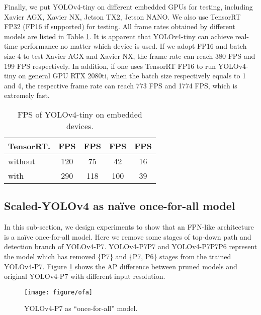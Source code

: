 \documentclass[10pt,twocolumn,letterpaper]{article}
\begin{document}
Finally, we put YOLOv4-tiny on different embedded GPUs for testing, including Xavier AGX, Xavier NX, Jetson TX2, Jetson NANO.  We also use TensorRT FP32 (FP16 if supported) for testing. All frame rates obtained by different models are listed in Table \ref{table:t15}.  It is apparent that YOLOv4-tiny can achieve real-time performance no matter which device is used.  If we adopt FP16 and batch size 4 to test Xavier AGX and Xavier NX, the frame rate can reach 380 FPS and 199 FPS respectively.  In addition, if one uses TensorRT FP16 to run YOLOv4-tiny on general GPU RTX 2080ti, when the batch size respectively equals to 1 and 4, the respective frame rate can reach 773 FPS and 1774 FPS, which is extremely fast.

\begin{table}[h]
	\centering
	\begin{threeparttable}[h]
		\footnotesize
		\caption{FPS of YOLOv4-tiny on embedded devices.}
		\label{table:t15}
		\setlength\tabcolsep{3.5pt}
		\begin{tabular}{lcccc}
			\toprule
			\textbf{TensorRT.} & \textbf{FPS} & \textbf{FPS} & \textbf{FPS} & \textbf{FPS} \\				
			\midrule
			without & 120 & 75 & 42 & 16 \\
			with & 290 & 118 & 100 & 39 \\
			\bottomrule
		\end{tabular}
	\end{threeparttable}
\end{table}

\subsection{Scaled-YOLOv4 as na\"ive once-for-all model}

In this sub-section, we design experiments to show that an FPN-like architecture is a naïve once-for-all model. Here we remove some stages of top-down path and detection branch of YOLOv4-P7. YOLOv4-P7P7 and YOLOv4-P7P7P6 represent the model which has removed \{P7\} and \{P7, P6\} stages from the trained YOLOv4-P7. Figure \ref{fig:ofa} shows the AP difference between pruned models and original YOLOv4-P7 with different input resolution.



\begin{figure}[h]
	\begin{center}
		\texttt{[image: figure/ofa]}
	\end{center}
	\vspace{-4mm}
	\caption{YOLOv4-P7 as ``once-for-all'' model.}
	\vspace{4mm}
	\label{fig:ofa}
\end{figure}
\end{document}
